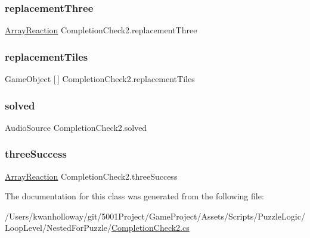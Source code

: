 \mbox{\label{class_completion_check2_a56390eb4e63df9107df6f1dbe6b36c34}} 
\subsubsection{\texorpdfstring{replacement\+Three}{replacementThree}}
{\footnotesize\ttfamily \hyperlink{class_array_reaction}{Array\+Reaction} Completion\+Check2.\+replacement\+Three}

\mbox{\label{class_completion_check2_a712fc392f7a484070dea22d804bf0ce9}} 
\subsubsection{\texorpdfstring{replacement\+Tiles}{replacementTiles}}
{\footnotesize\ttfamily Game\+Object \mbox{[}$\,$\mbox{]} Completion\+Check2.\+replacement\+Tiles}

\mbox{\label{class_completion_check2_ab543e719625d9de2a48b6817c41c3432}} 
\subsubsection{\texorpdfstring{solved}{solved}}
{\footnotesize\ttfamily Audio\+Source Completion\+Check2.\+solved}

\mbox{\label{class_completion_check2_a5304ab78c9a420165fa605e25ac5bdd6}} 
\subsubsection{\texorpdfstring{three\+Success}{threeSuccess}}
{\footnotesize\ttfamily \hyperlink{class_array_reaction}{Array\+Reaction} Completion\+Check2.\+three\+Success}



The documentation for this class was generated from the following file\+:\begin{DoxyCompactItemize}
\item 
/\+Users/kwanholloway/git/5001\+Project/\+Game\+Project/\+Assets/\+Scripts/\+Puzzle\+Logic/\+Loop\+Level/\+Nested\+For\+Puzzle/\hyperlink{_completion_check2_8cs}{Completion\+Check2.\+cs}\end{DoxyCompactItemize}
